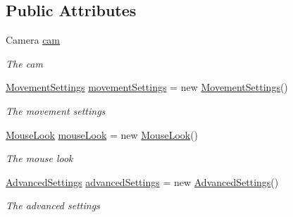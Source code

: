 \subsection*{Public Attributes}
\begin{DoxyCompactItemize}
\item 
Camera \hyperlink{class_lerp2_assets_1_1_characters_1_1_first_person_1_1_rigidbody_first_person_controller_a41a5f77e6802e71458f8bf7d3225531a}{cam}
\begin{DoxyCompactList}\small\item\em The cam \end{DoxyCompactList}\item 
\hyperlink{class_lerp2_assets_1_1_characters_1_1_first_person_1_1_rigidbody_first_person_controller_1_1_movement_settings}{Movement\+Settings} \hyperlink{class_lerp2_assets_1_1_characters_1_1_first_person_1_1_rigidbody_first_person_controller_aa2843469e525e0e693cad14e0406392a}{movement\+Settings} = new \hyperlink{class_lerp2_assets_1_1_characters_1_1_first_person_1_1_rigidbody_first_person_controller_1_1_movement_settings}{Movement\+Settings}()
\begin{DoxyCompactList}\small\item\em The movement settings \end{DoxyCompactList}\item 
\hyperlink{class_lerp2_assets_1_1_characters_1_1_first_person_1_1_mouse_look}{Mouse\+Look} \hyperlink{class_lerp2_assets_1_1_characters_1_1_first_person_1_1_rigidbody_first_person_controller_ac9b307ea39dbbcba9257a02634f4f316}{mouse\+Look} = new \hyperlink{class_lerp2_assets_1_1_characters_1_1_first_person_1_1_mouse_look}{Mouse\+Look}()
\begin{DoxyCompactList}\small\item\em The mouse look \end{DoxyCompactList}\item 
\hyperlink{class_lerp2_assets_1_1_characters_1_1_first_person_1_1_rigidbody_first_person_controller_1_1_advanced_settings}{Advanced\+Settings} \hyperlink{class_lerp2_assets_1_1_characters_1_1_first_person_1_1_rigidbody_first_person_controller_a6db1fbb990bc5bee0a2227a4ad434ed8}{advanced\+Settings} = new \hyperlink{class_lerp2_assets_1_1_characters_1_1_first_person_1_1_rigidbody_first_person_controller_1_1_advanced_settings}{Advanced\+Settings}()
\begin{DoxyCompactList}\small\item\em The advanced settings \end{DoxyCompactList}\end{DoxyCompactItemize}

